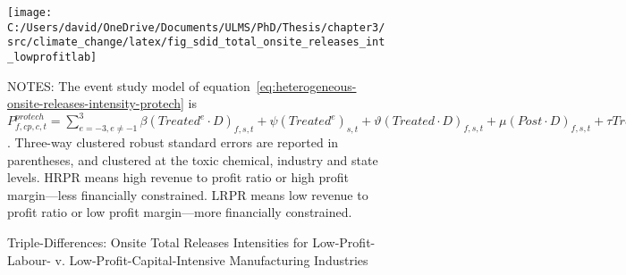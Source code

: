 \begin{figure}[H]
    \centering
    \texttt{[image: C:/Users/david/OneDrive/Documents/ULMS/PhD/Thesis/chapter3/src/climate\_change/latex/fig\_sdid\_total\_onsite\_releases\_int\_lowprofitlab]}
    \caption{Triple-Differences: Onsite Total Releases Intensities for Low-Profit-Labour- v. Low-Profit-Capital-Intensive Manufacturing Industries}
    \label{fig:heterogeneous-onsite-releases-intensities-lpli}
    \begin{minipage}{\columnwidth}
        \vspace{0.05in}
        \tiny NOTES: The event study model of equation~\ref{eq:heterogeneous-onsite-releases-intensity-protech} is $P_{f,cp,c,t}^{protech} = \sum_{{e = -3},{e \neq -1}}^{3} \beta (Treated^{e} \cdot D)_{f,s,t} + \psi (Treated^{e})_{s,t} + \vartheta (Treated \cdot D)_{f,s,t} + \mu (Post \cdot D)_{f,s,t} + \tau Treated_{s,t} + \rho D_{f,s,t} + \alpha Post_{t} + \delta X_{v,c,t-1} + \omega F_{f,t} + \lambda_{t} + \gamma_{f} + \phi_{cp} + \zeta_{c} + \eta_{c,t} + \theta_{cp,t} + \varepsilon_{f,cp,c,t}$. Three-way clustered robust standard errors are reported in parentheses, and clustered at the toxic chemical, industry and state levels. HRPR means high revenue to profit ratio or high profit margin---less financially constrained. LRPR means low revenue to profit ratio or low profit margin---more financially constrained.
    \end{minipage}
\end{figure}